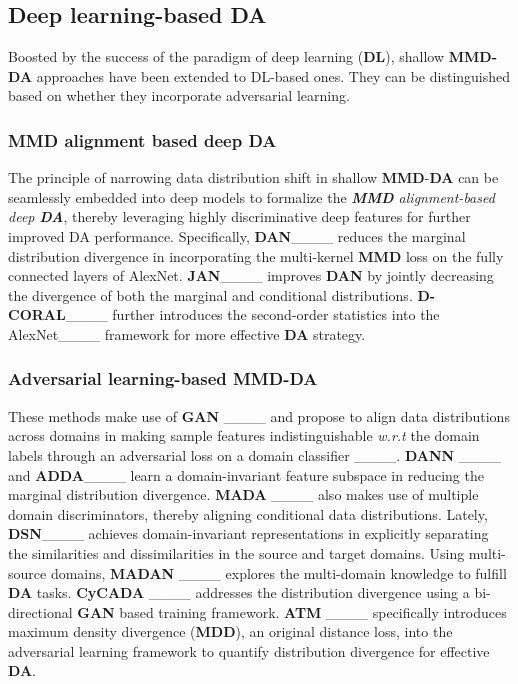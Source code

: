 \subsection{Deep learning-based \textbf{DA}}
\label{subsect: Deep DA}


Boosted by the success of the paradigm of deep learning (\textbf{DL}),  shallow \textbf{MMD-DA} approaches have been extended to DL-based ones. They can be distinguished based on whether they incorporate adversarial learning.





\subsubsection{MMD alignment based deep DA}

The principle of narrowing data distribution shift in shallow \textbf{MMD}-\textbf{DA} can be seamlessly embedded into deep models to formalize the \textit{\textbf{MMD} alignment-based deep \textbf{DA}}, thereby leveraging  highly discriminative deep features for further improved DA performance. Specifically, \textbf{DAN}____ reduces the marginal distribution divergence in incorporating the multi-kernel \textbf{MMD} loss on the fully connected layers of AlexNet. \textbf{JAN}____ improves \textbf{DAN} by jointly decreasing the divergence of both the marginal and conditional distributions. \textbf{D-CORAL}____ further introduces the second-order statistics into the AlexNet____ framework for more effective \textbf{DA} strategy. 
 



\subsubsection{Adversarial learning-based MMD-DA}
\label{Adversarial loss-based DA}
These methods make use of \textbf{GAN} ____ and propose to align data distributions across domains in making sample features indistinguishable \textit{w.r.t} the domain labels through an adversarial loss on a domain classifier ____. \textbf{DANN} ____ and \textbf{ADDA}____ learn a  domain-invariant feature subspace in reducing the marginal distribution divergence. \textbf{MADA} ____ also makes use of multiple domain discriminators, thereby aligning conditional data distributions. Lately, \textbf{DSN}____ achieves domain-invariant representations in explicitly separating the similarities and dissimilarities in the source and target domains. Using multi-source domains, \textbf{MADAN} ____ explores the multi-domain knowledge to fulfill \textbf{DA} tasks. \textbf{CyCADA} ____ addresses the distribution divergence using a bi-directional \textbf{GAN} based training framework.  \textbf{ATM} ____ specifically introduces maximum density divergence  (\textbf{MDD}), an original distance loss, into the adversarial learning framework to quantify distribution divergence for effective \textbf{DA}.


